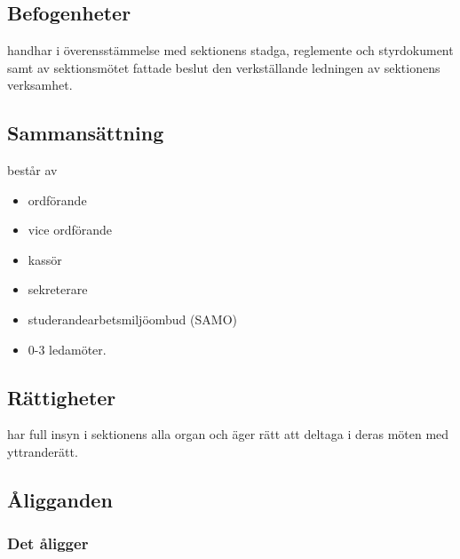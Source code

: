 \section{\STYRITFULL}
 
\subsection{Befogenheter}
\STYRIT{} handhar i överensstämmelse med sektionens stadga, reglemente och
styrdokument samt av sektionsmötet fattade beslut den verkställande
ledningen av sektionens verksamhet.
 
\subsection{Sammansättning}
\STYRIT{} består av
\begin{itemize}
	\item ordförande
	\item vice ordförande
	\item kassör
	\item sekreterare
	\item studerandearbetsmiljöombud (SAMO) 
	\item 0-3 ledamöter.
\end{itemize} 
 
\subsection{Rättigheter}
\STYRIT{} har full insyn i sektionens alla organ och äger rätt att deltaga i deras
möten med yttranderätt.
  
\subsection{Åligganden}

\subsubsection{Det åligger \STYRIT}

